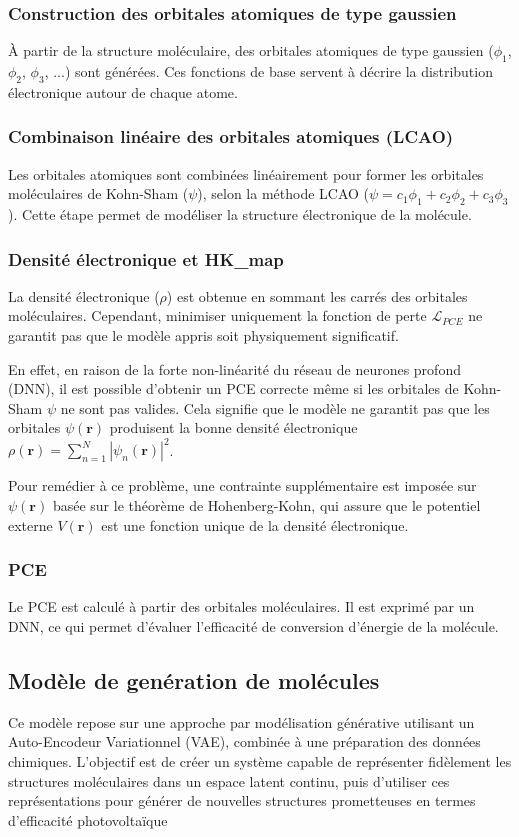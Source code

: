 \subsubsection{Construction des orbitales atomiques de type gaussien}
À partir de la structure moléculaire, des orbitales atomiques de type gaussien ($\phi_1$, $\phi_2$, $\phi_3$, ...) sont générées. Ces fonctions de base servent à décrire la distribution électronique autour de chaque atome.

\subsubsection{Combinaison linéaire des orbitales atomiques (LCAO)}
Les orbitales atomiques sont combinées linéairement pour former les orbitales moléculaires de Kohn-Sham ($\psi$), selon la méthode LCAO ($\psi = c_1\phi_1 + c_2\phi_2 + c_3\phi_3$). Cette étape permet de modéliser la structure électronique de la molécule.

\subsubsection{Densité électronique et HK\_map}
La densité électronique ($\rho$) est obtenue en sommant les carrés des orbitales moléculaires. Cependant, minimiser uniquement la fonction de perte $\mathcal{L}_{PCE}$ ne garantit pas que le modèle appris soit physiquement significatif. 

En effet, en raison de la forte non-linéarité du réseau de neurones profond (DNN), il est possible d'obtenir un PCE correcte même si les orbitales de Kohn-Sham $\psi$ ne sont pas valides. Cela signifie que le modèle ne garantit pas que les orbitales $\psi(\mathbf{r})$ produisent la bonne densité électronique $\rho(\mathbf{r}) = \sum_{n=1}^N |\psi_n(\mathbf{r})|^2$.

Pour remédier à ce problème, une contrainte supplémentaire est imposée sur $\psi(\mathbf{r})$ basée sur le théorème de Hohenberg-Kohn, qui assure que le potentiel externe $V(\mathbf{r})$ est une fonction unique de la densité électronique.

\subsubsection{PCE}
Le PCE est calculé à partir des orbitales moléculaires. Il est exprimé par un DNN, ce qui permet d'évaluer l'efficacité de conversion d'énergie de la molécule.

\subsection{Modèle de genération de molécules}
Ce modèle repose sur une approche par modélisation générative utilisant
un Auto-Encodeur Variationnel (VAE), combinée à une préparation des
données chimiques. L'objectif est de créer un système capable de représenter
fidèlement les structures moléculaires dans un espace latent continu, puis d'utiliser
ces représentations pour générer de nouvelles structures prometteuses en termes
d'efficacité photovoltaïque

